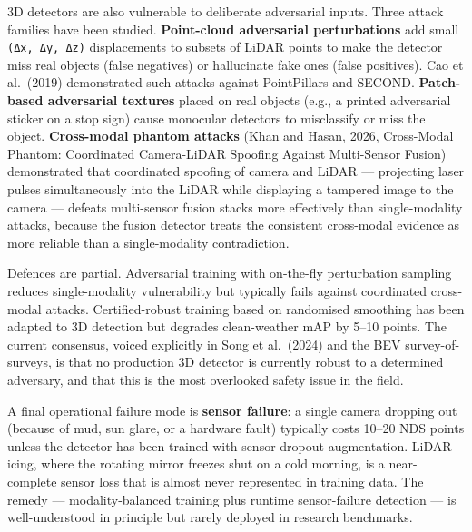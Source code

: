 3D detectors are also vulnerable to deliberate adversarial inputs. Three attack families have been studied. \textbf{Point-cloud adversarial perturbations} add small \texttt{(Δx,\ Δy,\ Δz)} displacements to subsets of LiDAR points to make the detector miss real objects (false negatives) or hallucinate fake ones (false positives). Cao et al.~(2019) demonstrated such attacks against PointPillars and SECOND. \textbf{Patch-based adversarial textures} placed on real objects (e.g., a printed adversarial sticker on a stop sign) cause monocular detectors to misclassify or miss the object. \textbf{Cross-modal phantom attacks} (Khan and Hasan, 2026, Cross-Modal Phantom: Coordinated Camera-LiDAR Spoofing Against Multi-Sensor Fusion) demonstrated that coordinated spoofing of camera and LiDAR --- projecting laser pulses simultaneously into the LiDAR while displaying a tampered image to the camera --- defeats multi-sensor fusion stacks more effectively than single-modality attacks, because the fusion detector treats the consistent cross-modal evidence as more reliable than a single-modality contradiction.

Defences are partial. Adversarial training with on-the-fly perturbation sampling reduces single-modality vulnerability but typically fails against coordinated cross-modal attacks. Certified-robust training based on randomised smoothing has been adapted to 3D detection but degrades clean-weather mAP by 5--10 points. The current consensus, voiced explicitly in Song et al.~(2024) and the BEV survey-of-surveys, is that no production 3D detector is currently robust to a determined adversary, and that this is the most overlooked safety issue in the field.

A final operational failure mode is \textbf{sensor failure}: a single camera dropping out (because of mud, sun glare, or a hardware fault) typically costs 10--20 NDS points unless the detector has been trained with sensor-dropout augmentation. LiDAR icing, where the rotating mirror freezes shut on a cold morning, is a near-complete sensor loss that is almost never represented in training data. The remedy --- modality-balanced training plus runtime sensor-failure detection --- is well-understood in principle but rarely deployed in research benchmarks.

